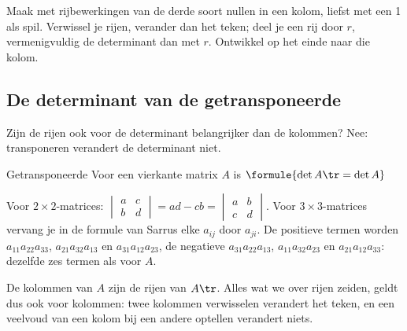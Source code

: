 \begin{werkwijze}
Maak met rijbewerkingen van de derde soort nullen in een kolom, liefst met een 1 als spil. Verwissel je rijen, verander dan het teken; deel je een rij door $r$, vermenigvuldig de determinant dan met $r$. Ontwikkel op het einde naar die kolom.
\end{werkwijze}

\begin{oefeningen}
\end{oefeningen}

\subsection{De determinant van de getransponeerde}

Zijn de rijen ook voor de determinant belangrijker dan de kolommen? Nee: transponeren verandert de determinant niet.

\begin{theorie}
\begin{stelling}{Getransponeerde}
Voor een vierkante matrix $A$ is \qquad $\formule{\det A\tr = \det A}$
\end{stelling}

\begin{bewijs}
Voor $2 \times 2$-matrices: $\begin{vmatrix} a & c \\ b & d \end{vmatrix} = ad - cb = \begin{vmatrix} a & b \\ c & d \end{vmatrix}$. Voor $3 \times 3$-matrices vervang je in de formule van Sarrus elke $a_{ij}$ door $a_{ji}$. De positieve termen worden $a_{11}a_{22}a_{33}$, $a_{21}a_{32}a_{13}$ en $a_{31}a_{12}a_{23}$, de negatieve $a_{31}a_{22}a_{13}$, $a_{11}a_{32}a_{23}$ en $a_{21}a_{12}a_{33}$: dezelfde zes termen als voor $A$.
\end{bewijs}
\end{theorie}

De kolommen van $A$ zijn de rijen van $A\tr$. Alles wat we over rijen zeiden, geldt dus ook voor kolommen: twee kolommen verwisselen verandert het teken, en een veelvoud van een kolom bij een andere optellen verandert niets.

